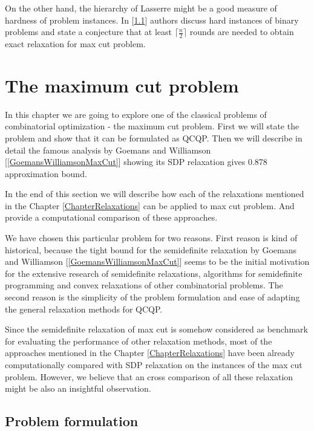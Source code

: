 \documentclass[12pt]{book}
\theoremstyle{definition}
\begin{document}
On the other hand, the hierarchy of Lasserre might be a good measure of hardness of problem instances. In [\ref{}]
authors discuss hard instances of binary problems and state a conjecture that at least $\lceil\frac{n}{2}\rceil$ rounds are needed to obtain exact relaxation for max cut problem.



\chapter{The maximum cut problem}

 In this chapter we are going to explore one of the classical problems of combinatorial optimization - the maximum cut problem. First we will state the problem and show that it can be formulated as QCQP. Then we will describe in detail the famous analysis by Goemans and Williamson [\ref{GoemansWilliamsonMaxCut}] showing its SDP relaxation gives 0.878 approximation bound. 
 
In the end of this section we will describe how each of the relaxations mentioned in the Chapter \ref{ChapterRelaxations} can be applied to max cut problem. And provide a computational comparison of these approaches.





We have chosen this particular problem for two reasons. First reason is kind of historical, because the tight bound for the semidefinite relaxation by Goemans and Williamson [\ref{GoemansWilliamsonMaxCut}] seems to be the initial motivation for the extensive research of semidefinite relaxations, algorithms for semidefinite programming and convex relaxations of other combinatorial problems. The second reason is the simplicity of the problem formulation and ease of adapting the general relaxation methods for QCQP.

Since the semidefinite relaxation of max cut is somehow considered as benchmark for evaluating the performance of other relaxation methods, 
most of the approaches mentioned in the Chapter \ref{ChapterRelaxations} have been already computationally compared with SDP relaxation on the instances of the max cut problem. However, we believe that an cross comparison of all these relaxation might be also an insightful observation.



\section{Problem formulation}
\end{document}
